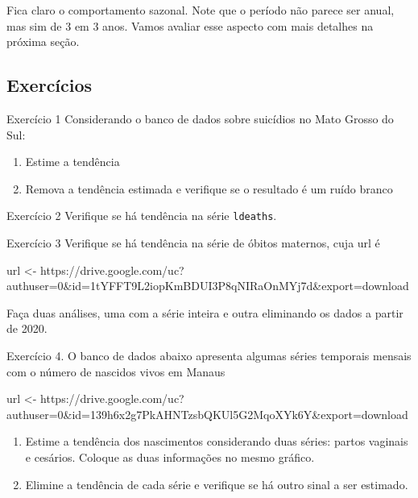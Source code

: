 \documentclass[
  letterpaper,
  DIV=11,
  numbers=noendperiod]{scrreprt}
\newenvironment{Shaded}{\begin{snugshade}}{\end{snugshade}}
\newcommand{\NormalTok}[1]{\textcolor[rgb]{0.00,0.23,0.31}{#1}}
\newcommand{\OtherTok}[1]{\textcolor[rgb]{0.00,0.23,0.31}{#1}}
\newcommand{\StringTok}[1]{\textcolor[rgb]{0.13,0.47,0.30}{#1}}
\begin{document}
Fica claro o comportamento sazonal. Note que o período não parece ser
anual, mas sim de 3 em 3 anos. Vamos avaliar esse aspecto com mais
detalhes na próxima seção.

\hypertarget{exercuxedcios-1}{%
\subsection{Exercícios}\label{exercuxedcios-1}}

Exercício 1 Considerando o banco de dados sobre suicídios no Mato Grosso
do Sul:

\begin{enumerate}
\def\labelenumi{\arabic{enumi}.}
\item
  Estime a tendência
\item
  Remova a tendência estimada e verifique se o resultado é um ruído
  branco
\end{enumerate}

Exercício 2 Verifique se há tendência na série \texttt{ldeaths}.

Exercício 3 Verifique se há tendência na série de óbitos maternos, cuja
url é

\begin{Shaded}
\begin{Highlighting}[]
\NormalTok{url }\OtherTok{\textless{}{-}} \StringTok{\textquotesingle{}https://drive.google.com/uc?authuser=0\&id=1tYFFT9L2iopKmBDUI3P8qNIRaOnMYj7d\&export=download\textquotesingle{}}
\end{Highlighting}
\end{Shaded}

Faça duas análises, uma com a série inteira e outra eliminando os dados
a partir de 2020.

Exercício 4. O banco de dados abaixo apresenta algumas séries temporais
mensais com o número de nascidos vivos em Manaus

\begin{Shaded}
\begin{Highlighting}[]
\NormalTok{url }\OtherTok{\textless{}{-}} \StringTok{\textquotesingle{}https://drive.google.com/uc?authuser=0\&id=139h6x2g7PkAHNTzsbQKUl5G2MqoXYk6Y\&export=download\textquotesingle{}}
\end{Highlighting}
\end{Shaded}

\begin{enumerate}
\def\labelenumi{\arabic{enumi}.}
\item
  Estime a tendência dos nascimentos considerando duas séries: partos
  vaginais e cesários. Coloque as duas informações no mesmo gráfico.
\item
  Elimine a tendência de cada série e verifique se há outro sinal a ser
  estimado.
\end{enumerate}
\end{document}
